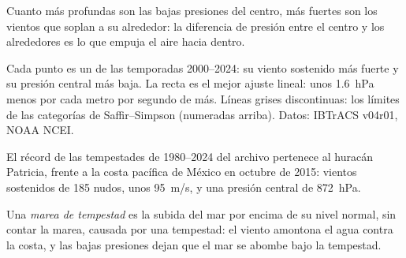 Cuanto más profundas son las bajas presiones del centro, más fuertes son los
vientos que soplan a su alrededor: la diferencia de presión entre el centro
y los alrededores es lo que empuja el aire hacia dentro.

\begin{omfigure}

{\small Cada punto es un  de las temporadas 2000--2024: su
viento sostenido más fuerte y su presión central más baja. La recta es el
mejor ajuste lineal: unos \qty{1.6}{hPa} menos por cada metro por segundo de
más. Líneas grises discontinuas: los límites de las categorías de
Saffir--Simpson (numeradas arriba). Datos: IBTrACS v04r01, NOAA NCEI.}
\end{omfigure}

El récord de las tempestades de 1980--2024 del archivo pertenece al huracán
Patricia, frente a la costa pacífica de México en octubre de 2015: vientos
sostenidos de 185 nudos, unos \qty{95}{m/s}, y una presión central de
\qty{872}{hPa}.

\begin{definition}\label{def:g10:storms-and-cyclones:storm-surge}
Una \emph{marea de tempestad} es la subida del mar
por encima de su nivel normal, sin contar la marea, causada por una
tempestad: el viento amontona el agua contra la costa, y las bajas presiones
dejan que el mar se abombe bajo la tempestad.
\end{definition}

